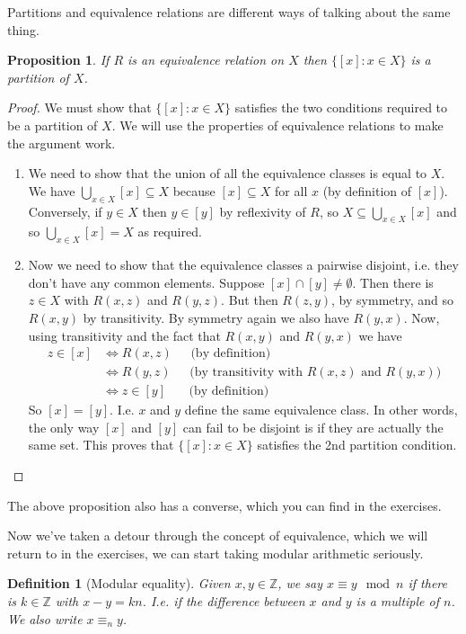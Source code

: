 \documentclass{article}
\theoremstyle{plain}
\newtheorem{proposition}[theorem]{Proposition}{\bfseries}{\itshape}
\newtheorem{definition}[theorem]{Definition}{\bfseries}{\upshape}
\newcommand{\bZ}{\mathbb{Z}}
\begin{document}
Partitions and equivalence relations are different ways of talking about the same thing.

\begin{proposition}\label{P:part}
If $R$ is an equivalence relation on $X$ then $\{[x]:x\in X\}$ is a partition of $X$.
\end{proposition}
\begin{proof}
We must show that $\{[x]:x\in X\}$ satisfies the two conditions required to be a partition of $X$. We will use the properties of equivalence relations to make the argument work. 
\begin{enumerate}
\item We need to show that the union of all the equivalence classes is equal to $X$. We have $\bigcup_{x\in X} [x] \subseteq X$ because $[x]\subseteq X$ for all $x$ (by definition of $[x]$). Conversely, if $y\in X$ then $y\in [y]$ by reflexivity of $R$, so $X\subseteq \bigcup_{x\in X} [x]$ and so $\bigcup_{x\in X} [x]= X$ as required. 
\item Now we need to show that the equivalence classes a pairwise disjoint, i.e. they don't have any common elements. Suppose $[x]\cap [y] \neq\emptyset$. Then there is $z\in X$ with $R(x,z)$ and $R(y,z)$. But then $R(z,y)$, by symmetry, and so $R(x,y)$ by transitivity.  By symmetry again we also have $R(y,x)$. Now, using transitivity and the fact that $R(x,y)$ and $R(y,x)$ we have 
\begin{align*}
z\in [x] &\iff R(x,z) \phantom{xx}\text{ (by definition)}\\
&\iff R(y,z) \phantom{xx}\text{ (by transitivity with $R(x,z)$ and $R(y,x)$)}\\
&\iff z\in [y] \phantom{xxi}\text{ (by definition)}
\end{align*} 
 So $[x]=[y]$. I.e. $x$ and $y$ define the same equivalence class. In other words, the only way $[x]$ and $[y]$ can fail to be disjoint is if they are actually the same set. This proves that $\{[x]:x\in X\}$ satisfies the 2nd partition condition.
\end{enumerate}
\end{proof}
The above proposition also has a converse, which you can find in the exercises.


Now we've taken a detour through the concept of equivalence, which we will return to in the exercises, we can start taking modular arithmetic seriously.

\begin{definition}[Modular equality]
Given $x,y\in \bZ$, we say $x \equiv y\mod n$ if there is $k\in\bZ$ with $x-y = kn$. I.e. if the difference between $x$ and $y$ is a multiple of $n$. We also write $x \equiv_n y$. 
\end{definition}
\end{document}
